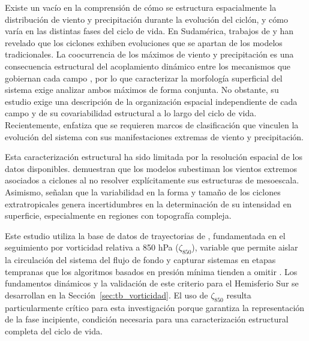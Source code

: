 Existe un vacío en la comprensión de cómo se estructura espacialmente la distribución de viento y precipitación durante la evolución del ciclón, y cómo varía en las distintas fases del ciclo de vida. 
En Sudamérica, trabajos de \citet{gozzo2013air} y \citet{reboita2022from} han revelado que los ciclones exhiben evoluciones que se apartan de los modelos tradicionales.
La coocurrencia de los máximos de viento y precipitación es una consecuencia estructural del acoplamiento dinámico entre los mecanismos que gobiernan cada campo \citep{chen2025characteristics}, por lo que caracterizar la morfología superficial del sistema exige analizar ambos máximos de forma conjunta. 
No obstante, su estudio exige una descripción de la organización espacial independiente de cada campo y de su covariabilidad estructural a lo largo del ciclo de vida. Recientemente, \citet{han2025system} enfatiza que se requieren marcos de clasificación que vinculen la evolución del sistema con sus manifestaciones extremas de viento y precipitación.

Esta caracterización estructural ha sido limitada por la resolución espacial de los datos disponibles. \citet{priestley2022improved} demuestran que los modelos subestiman los vientos extremos asociados a ciclones al no resolver explícitamente sus estructuras de mesoescala. Asimismo, \citet{neu2013intercomparison} señalan que la variabilidad en la forma y tamaño de los ciclones extratropicales genera incertidumbres en la determinación de su intensidad en superficie, especialmente en regiones con topografía compleja.


Este estudio utiliza la base de datos de trayectorias de \citet{coutodesouza2024new}, fundamentada en el seguimiento por vorticidad relativa a 850 hPa ($\zeta_{850}$), variable que permite aislar la circulación del sistema del flujo de fondo y capturar sistemas en etapas tempranas que los algoritmos basados en presión mínima tienden a omitir \citep{sinclair1994objective,sinclair1997objective}. 
Los fundamentos dinámicos y la validación de este criterio para el Hemisferio Sur se desarrollan en la Sección~\ref{sec:tb_vorticidad}. El uso de $\zeta_{850}$ resulta particularmente crítico para esta investigación porque garantiza la representación de la fase incipiente, condición necesaria para una caracterización estructural completa del ciclo de vida.

